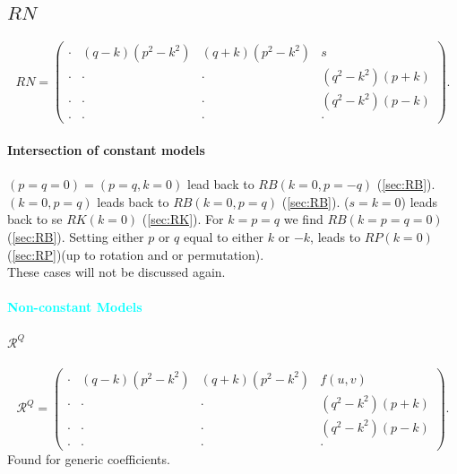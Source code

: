 \documentclass{article}
\begin{document}
\subsection{$RN$}
\label{sec:RN}
    \begin{equation}
     RN= \begin{pmatrix}
        \cdot&(q-k)(p^2-k^2)&(q+k)(p^2-k^2)&s\\
        \cdot&\cdot &\cdot&(q^2-k^2)(p+k)\\
        \cdot&\cdot&\cdot &(q^2-k^2)(p-k)\\
        \cdot&\cdot&\cdot&\cdot
    \end{pmatrix}.
\end{equation}

\paragraph{Intersection of constant models}
$(p=q=0)=(p=q,k=0)$ lead back to  $RB(k=0,p=-q)$ (\ref{sec:RB}). $(k=0,p=q)$ leads back to  $RB(k=0,p=q)$ (\ref{sec:RB}).
($s=k=0$) leads back to se $RK(k=0)$ (\ref{sec:RK}).
For $k=p=q$ we find $RB(k=p=q=0)$ (\ref{sec:RB}).
Setting either $p$ or $q$ equal to either $k$ or $-k$, leads to $RP(k=0)$ (\ref{sec:RP})(up to rotation and or permutation).
\\
These cases will not be discussed again.

\paragraph{\textcolor{Cyan}{Non-constant Models}}
\begin{center}
\end{center}

\paragraph{$\mathcal{R}^Q$}
 \begin{equation}
     \mathcal{R}^Q= \begin{pmatrix}
        \cdot&(q-k)(p^2-k^2)&(q+k)(p^2-k^2)&f(u,v)\\
        \cdot&\cdot &\cdot&(q^2-k^2)(p+k)\\
        \cdot&\cdot&\cdot &(q^2-k^2)(p-k)\\
        \cdot&\cdot&\cdot&\cdot
    \end{pmatrix}.
\end{equation}
Found for generic coefficients.
\end{document}

